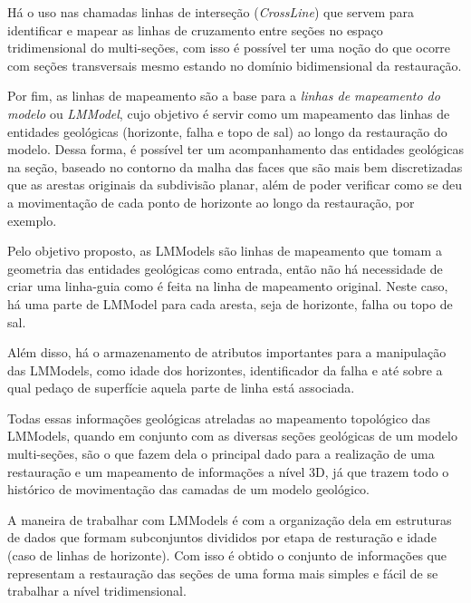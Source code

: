Há o uso nas chamadas linhas de interseção (\textit{CrossLine}) que servem para identificar e mapear as linhas de cruzamento entre seções no espaço tridimensional do multi-seções, com isso é possível ter uma noção do que ocorre com seções transversais mesmo estando no domínio bidimensional da restauração.

Por fim, as linhas de mapeamento são a base para a \textit{linhas de mapeamento do modelo} ou \textit{LMModel}, cujo objetivo é servir como um mapeamento das linhas de entidades geológicas (horizonte, falha e topo de sal) ao longo da restauração do modelo. Dessa forma, é possível ter um acompanhamento das entidades geológicas na seção, baseado no contorno da malha das faces que são mais bem discretizadas que as arestas originais da subdivisão planar, além de poder verificar como se deu a movimentação de cada ponto de horizonte ao longo da restauração, por exemplo.

Pelo objetivo proposto, as LMModels são linhas de mapeamento que tomam a geometria das entidades geológicas como entrada, então não há necessidade de criar uma linha-guia como é feita na linha de mapeamento original. Neste caso, há uma parte de LMModel para cada aresta, seja de horizonte, falha ou topo de sal.

Além disso, há o armazenamento de atributos importantes para a manipulação das LMModels, como idade dos horizontes, identificador da falha e até sobre a qual pedaço de superfície aquela parte de linha está associada.

Todas essas informações  geológicas atreladas ao mapeamento topológico das LMModels, quando em conjunto com as diversas seções geológicas de um modelo multi-seções, são o que fazem dela o principal dado para a realização de uma restauração e um mapeamento de informações a nível 3D, já que trazem todo o histórico de movimentação das camadas de um modelo geológico.

A maneira de trabalhar com LMModels é com a organização dela em estruturas de dados que formam subconjuntos divididos por etapa de resturação e idade (caso de linhas de horizonte). Com isso é obtido o conjunto de informações que representam a restauração das seções de uma forma mais simples e fácil de se trabalhar a nível tridimensional.


